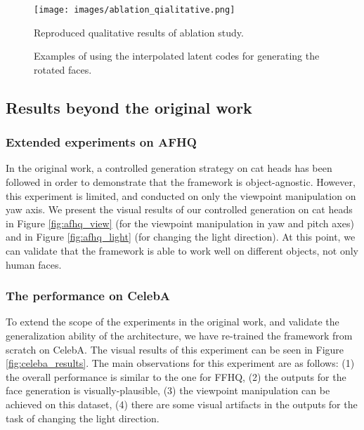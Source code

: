 \begin{figure}[t!]%
    \centering
    {\texttt{[image: images/ablation\_qialitative.png]} }%
    \caption{Reproduced qualitative results of ablation study.}%
    \label{fig:ablation_qual}%
\end{figure}

\begin{figure}[t!]%
    \centering
    \qquad
    \caption{Examples of using the interpolated latent codes for generating the rotated faces.}%
    \label{fig:interpolation}%
\end{figure}

\subsection{Results beyond the original work}

\subsubsection{Extended experiments on AFHQ}

In the original work, a controlled generation strategy on cat heads has been followed in order to demonstrate that the framework is object-agnostic. However, this experiment is limited, and conducted on only the viewpoint manipulation on yaw axis. We present the visual results of our controlled generation on cat heads in Figure \ref{fig:afhq_view} (for the viewpoint manipulation in yaw and pitch axes) and in Figure \ref{fig:afhq_light} (for changing the light direction). At this point, we can validate that the framework is able to work well on different objects, not only human faces.


\subsubsection{The performance on CelebA}
To extend the scope of the experiments in the original work, and validate the generalization ability of the architecture, we have re-trained the framework from scratch on CelebA. The visual results of this experiment can be seen in Figure \ref{fig:celeba_results}. The main observations for this experiment are as follows: (1) the overall performance is similar to the one for FFHQ, (2) the outputs for the face generation is visually-plausible, (3) the viewpoint manipulation can be achieved on this dataset, (4) there are some visual artifacts in the outputs for the task of changing the light direction.


